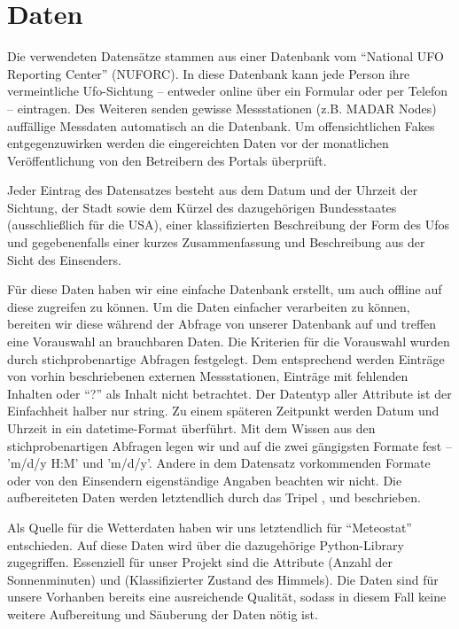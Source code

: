 \section{Daten} \label{data}

Die verwendeten Datensätze stammen aus einer Datenbank vom \enquote{National UFO Reporting Center} (NUFORC). In diese Datenbank kann jede Person ihre vermeintliche Ufo-Sichtung -- entweder online über ein Formular oder per Telefon -- eintragen. Des Weiteren senden gewisse Messstationen (z.B. MADAR Nodes) auffällige Messdaten automatisch an die Datenbank. Um offensichtlichen Fakes entgegenzuwirken werden die eingereichten Daten vor der monatlichen Veröffentlichung von den Betreibern des Portals überprüft.

Jeder Eintrag des Datensatzes besteht aus dem Datum und der Uhrzeit der Sichtung, der Stadt sowie dem Kürzel des dazugehörigen Bundesstaates (ausschließlich für die USA), einer klassifizierten Beschreibung der Form des Ufos und gegebenenfalls einer kurzes Zusammenfassung und Beschreibung aus der Sicht des Einsenders.

Für diese Daten haben wir eine einfache Datenbank erstellt, um auch offline auf diese zugreifen zu können. Um die Daten einfacher verarbeiten zu können, bereiten wir diese während der Abfrage von unserer Datenbank auf und treffen eine Vorauswahl an brauchbaren Daten. Die Kriterien für die Vorauswahl wurden durch stichprobenartige Abfragen festgelegt. Dem entsprechend werden Einträge von vorhin beschriebenen externen Messstationen, Einträge mit fehlenden Inhalten oder \enquote{?} als Inhalt nicht betrachtet. Der Datentyp aller Attribute ist der Einfachheit halber nur string. Zu einem späteren Zeitpunkt werden Datum und Uhrzeit in ein datetime-Format überführt. Mit dem Wissen aus den stichprobenartigen Abfragen legen wir und auf die zwei gängigsten Formate fest -- 'm/d/y H:M' und 'm/d/y'. Andere in dem Datensatz vorkommenden Formate oder von den Einsendern eigenständige Angaben beachten wir nicht. Die aufbereiteten Daten werden letztendlich durch das Tripel ,  und  beschrieben.

Als Quelle für die Wetterdaten haben wir uns letztendlich für \enquote{Meteostat} entschieden\cite{meteostat:2021}. Auf diese Daten wird über die dazugehörige Python-Library zugegriffen. Essenziell für unser Projekt sind die Attribute  (Anzahl der Sonnenminuten) und  (Klassifizierter Zustand des Himmels). Die Daten sind für unsere Vorhanben bereits eine ausreichende Qualität, sodass in diesem Fall keine weitere Aufbereitung und Säuberung der Daten nötig ist.

